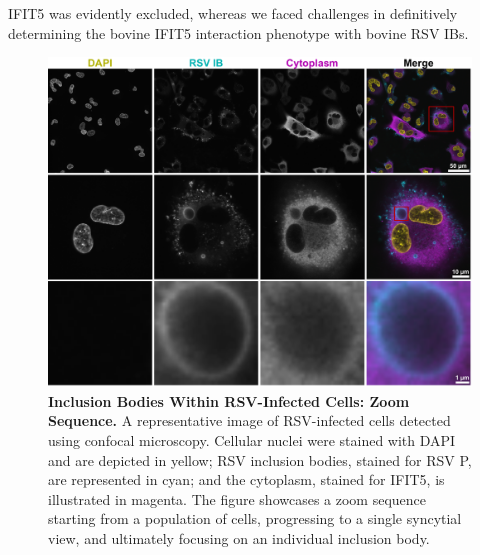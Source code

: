 IFIT5 was evidently excluded, whereas we faced challenges in definitively determining the bovine IFIT5 interaction phenotype with bovine RSV IBs.

\begin{figure}
    \centering
    \includegraphics[width=1\linewidth]{08. Chapter 3/Figs/01. Localisation introduction/01. IB-zooms.pdf}
    \caption[Inclusion Bodies Within RSV-Infected Cells: Zoom Sequence.]{\textbf{Inclusion Bodies Within RSV-Infected Cells: Zoom Sequence.} A representative image of RSV-infected cells detected using confocal microscopy. Cellular nuclei were stained with DAPI and are depicted in yellow; RSV inclusion bodies, stained for RSV P, are represented in cyan; and the cytoplasm, stained for IFIT5, is illustrated in magenta. The figure showcases a zoom sequence starting from a population of cells, progressing to a single syncytial view, and ultimately focusing on an individual inclusion body.}
    \label{fig:Inclusion Bodies Within RSV Infected Cells: Zoom Sequence}
\end{figure}

